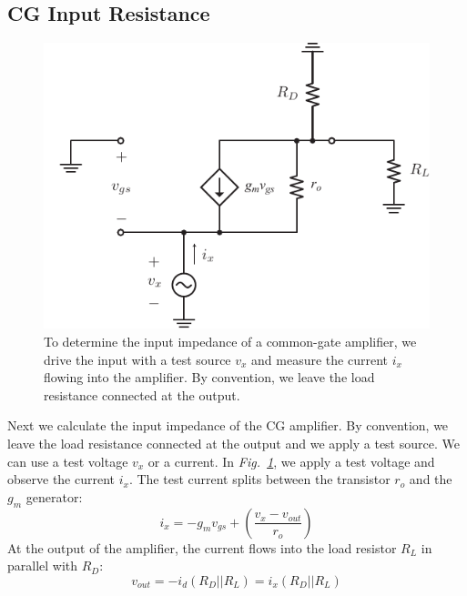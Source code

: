 \subsection{CG Input Resistance}
\begin{figure}[tb]
\centering
\includegraphics[scale=.9]{cgamp_is_ac_ss_zin}
\caption{To determine the input impedance of a common-gate amplifier, we drive the input with a test source $v_x$ and measure the current $i_x$ flowing into the amplifier.  By convention, we leave the load resistance connected at the output.}
\label{fig:cgamp_is_ac_ss_zin}
\end{figure}
Next we calculate the input impedance of the CG amplifier.  By convention, we leave the load resistance connected at the output and we apply a test source.  We can use a test voltage $v_x$ or a current.  In \emph{Fig.~\ref{fig:cgamp_is_ac_ss_zin}}, we apply a test voltage and observe the current $i_x$.  The test current splits between the transistor $r_o$ and the $g_m$ generator:
    \begin{equation}
        {i_x} =  - {g_m}{v_{gs}} + \left( {\frac{{{v_x} - {v_{out}}}}{{{r_o}}}} \right) \label{eq:cg_input}
    \end{equation}
At the output of the amplifier, the current flows into the load resistor $R_L$ in parallel with $R_D$:
    \begin{equation}
        {v_{out}} =  - {i_d}({R_D}||{R_L}) = {i_x}({R_D}||{R_L})
    \end{equation}
